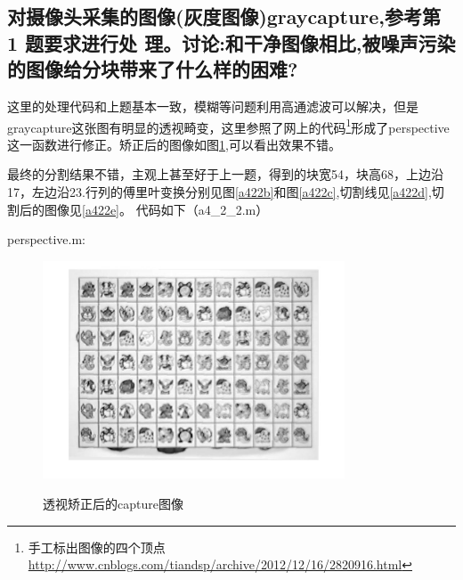 \documentclass{ctexart}
\begin{document}
\subsection{对摄像头采集的图像(灰度图像)graycapture,参考第 1 题要求进行处
理。讨论:和干净图像相比,被噪声污染的图像给分块带来了什么样的困难?}
这里的处理代码和上题基本一致，模糊等问题利用高通滤波可以解决，但是graycapture这张图有明显的透视畸变，这里参照了网上的代码\footnote{手工标出图像的四个顶点\url{http://www.cnblogs.com/tiandsp/archive/2012/12/16/2820916.html}}形成了perspective这一函数进行修正。矫正后的图像如图\ref{a422a},可以看出效果不错。

最终的分割结果不错，主观上甚至好于上一题，得到的块宽54，块高68，上边沿17，左边沿23.行列的傅里叶变换分别见图\ref{a422b}和图\ref{a422c},切割线见\ref{a422d},切割后的图像见\ref{a422e}。
代码如下（a4\_2\_2.m）

perspective.m:

\begin{figure}
    \centering
    \includegraphics[width=0.8\textwidth]{process/a422a.jpg}\\
    \caption{透视矫正后的capture图像\label{a422a}}
\end{figure}
\end{document}
